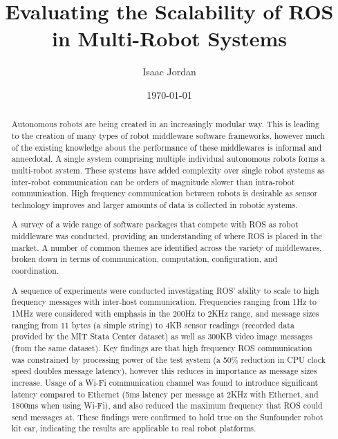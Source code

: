\documentclass{l4proj}
\begin{document}
\title{Evaluating the Scalability of ROS in Multi-Robot Systems}
\author{Isaac Jordan}
\date{\today}
\maketitle

\begin{abstract}
Autonomous robots are being created in an increasingly modular way. This is leading to the creation of many types of robot middleware software frameworks, however much of the existing knowledge about the performance of these middlewares is informal and annecdotal. A single system comprising multiple individual autonomous robots forms a multi-robot system. These systems have added complexity over single robot systems as inter-robot communication can be orders of magnitude slower than intra-robot communication. High frequency communication between robots is desirable as sensor technology improves and larger amounts of data is collected in robotic systems.

A survey of a wide range of software packages that compete with ROS as robot middleware was conducted, providing an understanding of where ROS is placed in the market. A number of common themes are identified across the variety of middlewares, broken down in terms of communication, computation, configuration, and coordination.

A sequence of experiments were conducted investigating ROS' ability to scale to high frequency messages with inter-host communication. Frequencies ranging from 1Hz to 1MHz were considered with emphasis in the 200Hz to 2KHz range, and message sizes ranging from 11 bytes (a simple string) to 4KB sensor readings (recorded data provided by the MIT Stata Center dataset) as well as 300KB video image messages (from the same dataset). Key findings are that high frequency ROS communication was constrained by processing power of the test system (a 50\% reduction in CPU clock speed doubles message latency), however this reduces in importance as message sizes increase. Usage of a Wi-Fi communication channel was found to introduce significant latency compared to Ethernet (5ms latency per message at 2KHz with Ethernet, and 1800ms when using Wi-Fi), and also reduced the maximum frequency that ROS could send messages at. These findings were confirmed to hold true on the Sunfounder robot kit car, indicating the results are applicable to real robot platforms.


\end{abstract}
\end{document}
